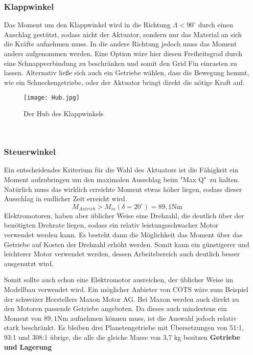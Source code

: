\subsubsection{Klappwinkel}
Das Moment um den Klappwinkel wird in die Richtung $\Lambda < 90^\circ$ durch einen Anschlag gestützt, sodass nicht der Aktuator, sondern nur das Material an sich die Kräfte aufnehmen muss. In die andere Richtung jedoch muss das Moment anders aufgenommen werden. Eine Option wäre hier diesen Freiheitsgrad durch eine Schnappverbindung zu beschränken und somit den Grid Fin einrasten zu lassen. Alternativ ließe sich auch ein Getriebe wählen, dass die Bewegung hemmt, wie ein Schneckengetriebe, oder der Aktuator bringt direkt die nötige Kraft auf.
\begin{figure}[h]
	\centering
	\texttt{[image: Hub.jpg]}
	\caption{Der Hub des Klappwinkels}
	\label{abb_hub}
\end{figure}\\
\subsubsection{Steuerwinkel}
Ein entscheidendes Kriterium für die Wahl des Aktuators ist die Fähigkeit ein Moment aufzubringen um den maximalen Ausschlag beim "Max Q"\ zu halten. Natürlich muss das wirklich erreichte Moment etwas höher liegen, sodass dieser Ausschlag in endlicher Zeit erreicht wird.
\begin{equation}
	M_{Antrieb} > M_m(\delta = 20^\circ) = 89,1\mathrm{Nm}
\end{equation}
Elektromotoren, haben aber üblicher Weise eine Drehzahl, die deutlich über der benötigten Drehrate liegen, sodass ein relativ leistungsschwacher Motor verwendet werden kann. Es besteht dann die Möglichkeit das Moment über das Getriebe auf Kosten der Drehzahl erhöht werden. Somit kann ein günstigerer und leichterer Motor verwendet werden, dessen Arbeitsbereich auch deutlich besser ausgenutzt wird.

Somit sollte auch schon eine Elektromotor ausreichen, der üblicher Weise im Modellbau verwendet wird. Ein möglicher Anbieter von COTS wäre zum Beispiel der schweizer Herstellers Maxon Motor AG. Bei Maxon werden auch direkt zu den Motoren passende Getriebe angeboten. Da dieses auch mindestens ein Moment von $89,1\mathrm{Nm}$ aufnehmen können muss, ist die Auswahl jedoch relativ stark beschränkt. Es bleiben drei Planetengetriebe mit Übersetzungen von 51:1, 93:1 und 308:1 übrige, die alle die gleiche Masse von 3,7 kg besitzen
\textbf{Getriebe und Lagerung}

